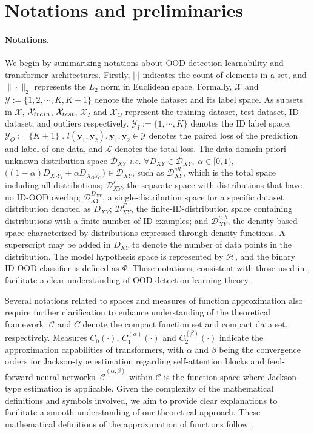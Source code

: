 \documentclass{article}
\theoremstyle{plain}
\theoremstyle{definition}
\theoremstyle{remark}
\begin{document}
\section{Notations and preliminaries}\label{appendix notation}
\paragraph{Notations.}
We begin by summarizing notations about OOD detection learnability and transformer architectures. Firstly, $|\cdot|$ indicates the count of elements in a set, and $\|\cdot\|_2$ represents the $L_2$ norm in Euclidean space. 
%
Formally, $\mathcal{X}$ and $\mathcal{Y}:=\{1,2,\cdots, K, K+1\}$ denote the whole dataset and its label space. As subsets in $\mathcal{X}$, $\mathcal{X}_{\rm train}$, $\mathcal{X}_{\rm test}$, $\mathcal{X}_I$ and $\mathcal{X}_O$ represent the training dataset, test dataset, ID dataset, and outliers respectively.
$\mathcal{Y}_I:=\{1,\cdots,K\}$ denotes the ID label space, $\mathcal{Y}_O:=\{K+1\}$ . $l(\mathbf{y}_1,\mathbf{y}_2),\mathbf{y}_1,\mathbf{y}_2\in \mathcal{Y}$ denotes the paired loss of the prediction and label of one data, and $\mathcal{L}$ denotes the total loss. 
The data domain priori-unknown distribution space $\mathcal{D}_{XY}$ \textit{i.e.} $\forall D_{XY}\in \mathcal{D}_{XY},~\alpha\in [0,1)$, $\bigl((1-\alpha)D_{X_IY_I}+\alpha D_{X_OY_O}\bigr)\in \mathcal{D}_{XY}$, such as $\mathcal{D}_{XY}^{all}$, which is the total space including all distributions; $\mathcal{D}_{XY}^s$, the separate space with distributions that have no ID-OOD overlap; $\mathcal{D}_{XY}^{D_{XY}}$, a single-distribution space for a specific dataset distribution denoted as $D_{XY}$; $\mathcal{D}_{XY}^{F}$, the finite-ID-distribution space containing distributions with a finite number of ID examples; and $\mathcal{D}_{XY}^{\mu, b}$, the density-based space characterized by distributions expressed through density functions. 
%
A superscript may be added in $D_{XY}$ to denote the number of data points in the distribution. 
The model hypothesis space is represented by $\mathcal{H}$, and the binary ID-OOD classifier is defined as $\Phi$. These notations, consistent with those used in \citet{fang2022out}, facilitate a clear understanding of OOD detection learning theory.

Several notations related to spaces and measures of function approximation also require further clarification to enhance understanding of the theoretical framework. $\mathcal{C}$ and $C$ denote the compact function set and compact data set, respectively. 
Measures $C_0(\cdot)$, $C_1^{(\alpha)}(\cdot)$ and $C_2^{(\beta)}(\cdot)$ indicate the approximation capabilities of transformers, with $\alpha$ and $\beta$ being the convergence orders for Jackson-type estimation regarding self-attention blocks and feed-forward neural networks. $\widetilde{\mathcal{C}}^{(\alpha, \beta)}$ within $\mathcal{C}$ is the function space where Jackson-type estimation is applicable. 
Given the complexity of the mathematical definitions and symbols involved, we aim to provide clear explanations to facilitate a smooth understanding of our theoretical approach. These mathematical definitions of the approximation of functions follow \citet{jiang2023approximation}.
\end{document}
